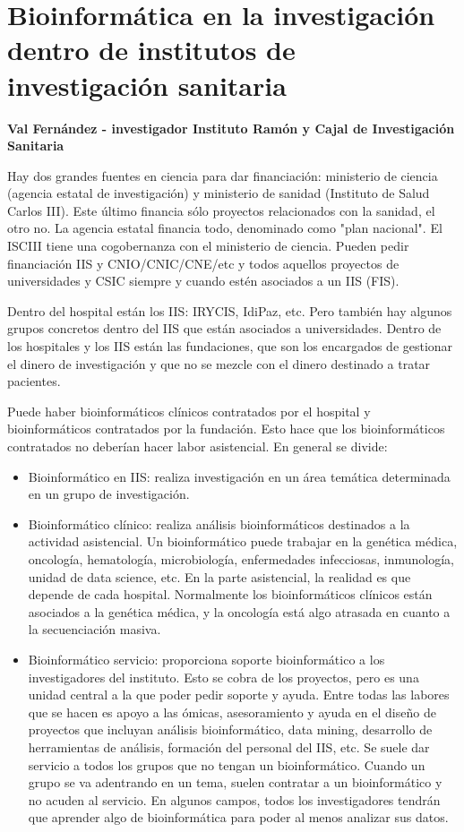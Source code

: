 \section{Bioinformática en la investigación dentro de institutos de investigación sanitaria}
\textbf{Val Fernández - investigador Instituto Ramón y Cajal de Investigación Sanitaria}

Hay dos grandes fuentes en ciencia para dar financiación: ministerio de ciencia (agencia estatal de investigación) y ministerio de sanidad (Instituto de Salud Carlos III). Este último financia sólo proyectos relacionados con la sanidad, el otro no. La agencia estatal financia todo, denominado como "plan nacional". El ISCIII tiene una cogobernanza con el ministerio de ciencia. Pueden pedir financiación IIS y CNIO/CNIC/CNE/etc y todos aquellos proyectos de universidades y CSIC siempre y cuando estén asociados a un IIS (FIS). 

Dentro del hospital están los IIS: IRYCIS, IdiPaz, etc. Pero también hay algunos grupos concretos dentro del IIS que están asociados a universidades. Dentro de los hospitales y los IIS están las fundaciones, que son los encargados de gestionar el dinero de investigación y que no se mezcle con el dinero destinado a tratar pacientes. 

Puede haber bioinformáticos clínicos contratados por el hospital y bioinformáticos contratados por la fundación. Esto hace que los bioinformáticos contratados no deberían hacer labor asistencial. 
En general se divide:
\begin{itemize}
\item Bioinformático en IIS: realiza investigación en un área temática determinada en un grupo de investigación.

\item Bioinformático clínico: realiza análisis bioinformáticos destinados a la actividad asistencial. Un bioinformático puede trabajar en la genética médica, oncología, hematología, microbiología, enfermedades infecciosas, inmunología, unidad de data science, etc. En la parte asistencial, la realidad es que depende de cada hospital. Normalmente los bioinformáticos clínicos están asociados a la genética médica, y la oncología está algo atrasada en cuanto a la secuenciación masiva. 

\item Bioinformático servicio: proporciona soporte bioinformático a los investigadores del instituto. Esto se cobra de los proyectos, pero es una unidad central a la que poder pedir soporte y ayuda. Entre todas las labores que se hacen es apoyo a las ómicas, asesoramiento y ayuda en el diseño de proyectos que incluyan análisis bioinformático, data mining, desarrollo de herramientas de análisis, formación del personal del IIS, etc. Se suele dar servicio a todos los grupos que no tengan un bioinformático. Cuando un grupo se va adentrando en un tema, suelen contratar a un bioinformático y no acuden al servicio. En algunos campos, todos los investigadores tendrán que aprender algo de bioinformática para poder al menos analizar sus datos. 
\end{itemize} 

